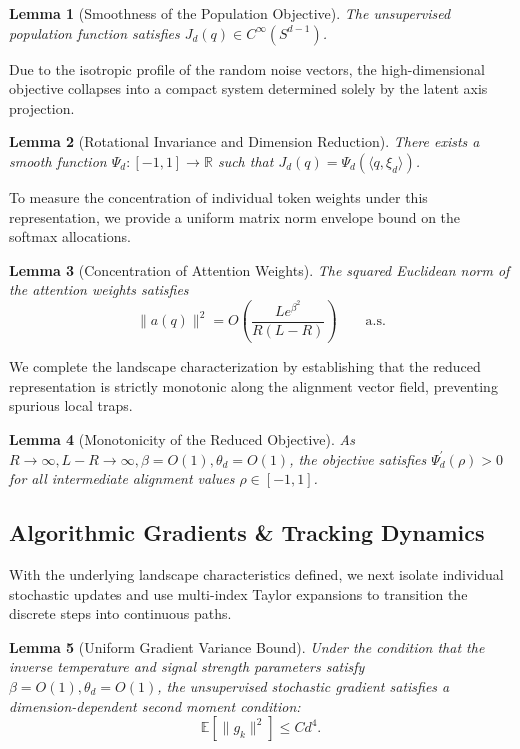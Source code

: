 \documentclass[11pt,a4paper]{article}
\newtheorem{lemma}{Lemma}
\theoremstyle{definition}
\begin{document}
\begin{lemma}[Smoothness of the Population Objective] \label{lem:lem1}
The unsupervised population function satisfies $J_{d}(q) \in C^{\infty}(S^{d-1})$.
\end{lemma}

\noindent Due to the isotropic profile of the random noise vectors, the high-dimensional objective collapses into a compact system determined solely by the latent axis projection.

\begin{lemma}[Rotational Invariance and Dimension Reduction] \label{lem:lem2}
There exists a smooth function $\Psi_{d}:[-1,1] \rightarrow \mathbb{R}$ such that $J_{d}(q) = \Psi_{d}(\langle q, \xi_{d} \rangle)$.
\end{lemma}

\noindent To measure the concentration of individual token weights under this representation, we provide a uniform matrix norm envelope bound on the softmax allocations.

\begin{lemma}[Concentration of Attention Weights] \label{lem:lem3}
The squared Euclidean norm of the attention weights satisfies 
\begin{equation}
    \|a(q)\|^2 =O\left( \frac{L e^{\beta^2} }{R(L-R)}\right) \qquad\text{a.s.}
\end{equation}
\end{lemma}

\noindent We complete the landscape characterization by establishing that the reduced representation is strictly monotonic along the alignment vector field, preventing spurious local traps.

\begin{lemma}[Monotonicity of the Reduced Objective] \label{lem:lem4}
As $R \to \infty, L-R \to \infty, \beta=O(1), \theta_d =O(1)$, the objective satisfies $\Psi_{d}^{\prime}(\rho) > 0$ for all intermediate alignment values $\rho \in [-1,1]$.
\end{lemma}


\subsection{Algorithmic Gradients \& Tracking Dynamics}
With the underlying landscape characteristics defined, we next isolate individual stochastic updates and use multi-index Taylor expansions to transition the discrete steps into continuous paths.

\begin{lemma}[Uniform Gradient Variance Bound] \label{lem:lem5}
Under the condition that the inverse temperature and signal strength parameters satisfy $\beta =O(1), \theta_d = O(1)$, the unsupervised stochastic gradient satisfies a dimension-dependent second moment condition:
\begin{equation}
    \mathbb{E}\left[ \|g_k\|^{2} \right] \le C d^{4}.
\end{equation}
\end{lemma}
\end{document}
